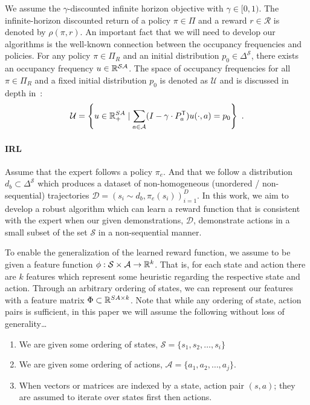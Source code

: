 \documentclass[11pt]{article}
\begin{document}
We assume the $\gamma$-discounted infinite horizon objective with $\gamma \in [0,1)$.
The infinite-horizon discounted return of a policy $\pi \in \Pi$ and a reward $r \in \mathcal{R}$ is denoted by $\rho(\pi, r)$.
An important fact that we will need to develop our algorithms is the well-known connection between the occupancy frequencies and policies.
For any policy $\pi\in\Pi_R$ and an initial distribution $p_0\in \Delta^{\mathcal{S}}$, there exists an occupancy frequency $u\in \mathbb{R}^{\mathcal{S}\mathcal{A}}$.
The space of occupancy frequencies for all $\pi\in \Pi_R$ and a fixed initial distribution $p_0$ is denoted as $\mathcal{U}$
and is discussed in depth in~\cite{Puterman1994}:
\[
	\mathcal{U} = \left\{ u\in \mathbb{R}^{SA}_{+} \mid \sum_{a\in \mathcal{A}} (I - \gamma\cdot P^{\mathsf{T}}_a) u(\cdot, a) = p_0 \right\}~.
\]

\paragraph{IRL}
Assume that the expert follows a policy $\pi_e$. And that we follow a distribution $d_b \subset \Delta^{\mathcal{S}}$
which produces a dataset of non-homogeneous (unordered / non-sequential)
trajectories $\mathcal{D} = {(s_i \sim d_b, \pi_e(s_i))}_{i=1}^D$. In this work, we aim
to develop a robust algorithm which can learn a reward function that is
consistent with the expert when our given demonstrations, $\mathcal{D}$,
demonstrate actions in a small subset of the set $\mathcal{S}$ in a
non-sequential manner.

To enable the generalization of the learned reward function, we assume to be given a feature function $\phi: \mathcal{S} \times \mathcal{A}\to \mathbb{R}^k$. That is, for each state and action there are $k$ features which represent some heuristic regarding the respective state and action. Through an arbitrary ordering of states, we can represent our features with a feature matrix $\Phi \subset \mathbb{R}^{SA\times k}$. Note that while any ordering of state, action pairs is sufficient, in this paper we will assume the following without loss of generality\dots
\begin{enumerate}
	\item We are given some ordering of states, $\mathcal{S} = \{ s_1, s_2, \dots, s_i \}$
	\item We are given some ordering of actions, $\mathcal{A} = \{ a_1, a_2, \dots, a_j \}$.
	\item When vectors or matrices are indexed by a state, action pair $(s,a)$; they are assumed to iterate over
	      states first then actions.
\end{enumerate}
\end{document}

